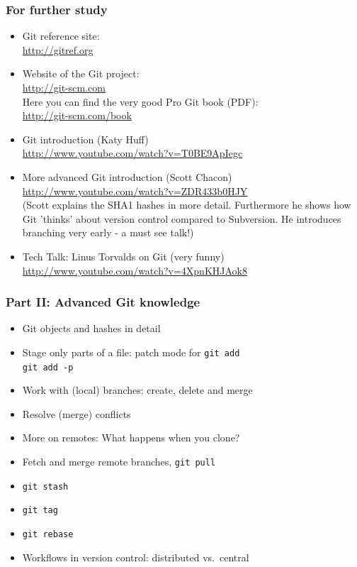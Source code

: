 \documentclass[handout,notes]{gittalk}
\newcommand{\hlcommand}[1]{ %
\colorbox{base3}{\small \texttt{#1}}
}
\begin{document}
\begin{frame}
\frametitle{For further study}
\begin{itemize}
  \item Git reference site:\\
  \url{http://gitref.org}
  \item Website of the Git project:\\
  \url{http://git-scm.com}\\
  Here you can find the very good Pro Git book (PDF):\\
  \url{http://git-scm.com/book}
  \item Git introduction (Katy Huff)\\
        \url{http://www.youtube.com/watch?v=T0BE9ApIegc}
  \item More advanced Git introduction (Scott Chacon)\\
        \url{http://www.youtube.com/watch?v=ZDR433b0HJY}\\
        (Scott explains the SHA1 hashes in more detail. Furthermore he shows
        how Git 'thinks' about version control compared to Subversion. He
        introduces branching very early - a must see talk!)
  \item Tech Talk: Linus Torvalds on Git (very funny)\\
        \url{http://www.youtube.com/watch?v=4XpnKHJAok8}
\end{itemize}
\end{frame}

\begin{frame}
\frametitle{Part II: Advanced Git knowledge}
\begin{itemize}
  \item Git objects and hashes in detail
  \item Stage only parts of a file: patch mode for \texttt{git add} \\
  \hlcommand{git add -p}
  \item Work with (local) branches: create, delete and merge
  \item Resolve (merge) conflicts
  \item More on remotes: What happens when you clone?
  \item Fetch and merge remote branches, \hlcommand{git pull}
  \item \hlcommand{git stash}
  \item \hlcommand{git tag}
  \item \hlcommand{git rebase}
  \item Workflows in version control: distributed vs.~central
\end{itemize}
\end{frame}
\end{document}
